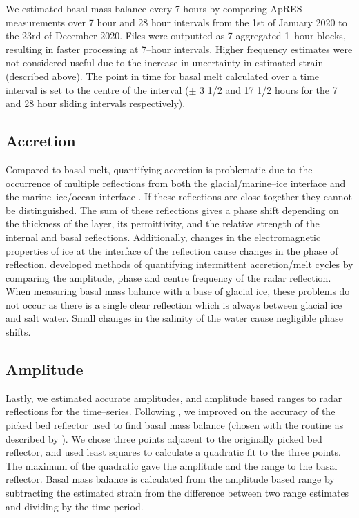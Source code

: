 We estimated basal mass balance every 7 hours by comparing ApRES measurements over 7 hour and 28 hour intervals from the 1st of January 2020 to the 23rd of December 2020. Files were outputted as 7 aggregated 1--hour blocks, resulting in faster processing at 7--hour intervals. Higher frequency estimates were not considered useful due to the increase in uncertainty in estimated strain  (described above).    The point in time for basal melt calculated over a time interval is set to the centre of the interval ($\pm$ 3 1/2 and 17 1/2 hours for the 7 and 28 hour sliding intervals respectively).

\subsection{Accretion}
Compared to basal melt, quantifying accretion is problematic due to the occurrence of multiple reflections from both the glacial/marine--ice interface and the marine--ice/ocean interface \citep{vavnkova2020observations}.  
If these reflections are close together they cannot be distinguished. The sum of these reflections gives a phase shift depending on the thickness of the layer, its permittivity, and the relative strength of the internal and basal reflections.  
Additionally, changes in the electromagnetic properties of ice at the interface of the reflection cause changes in the phase of reflection. \cite{vavnkova2021nature} developed methods of quantifying intermittent accretion/melt cycles by comparing the amplitude, phase and centre frequency of the radar reflection.
When measuring basal mass balance with a base of glacial ice, these problems do not occur as there is a single clear reflection which is always between glacial ice and salt water. Small changes in the salinity of the water cause negligible phase shifts. 

\subsection{Amplitude}

Lastly, we estimated accurate amplitudes, and amplitude based ranges to radar reflections for the time--series.
Following \cite{vavnkova2021nature}, we improved on the accuracy of the picked bed reflector used to find basal mass balance (chosen with the routine as described by \citep{stewart2018ice}). We chose three points adjacent to the originally picked bed reflector, and used least squares to calculate a quadratic fit to the three points. The maximum of the quadratic gave the amplitude and the range to the basal reflector.
Basal mass balance is calculated from the amplitude based range by subtracting the estimated strain from the difference between two range estimates and dividing by the time period.

